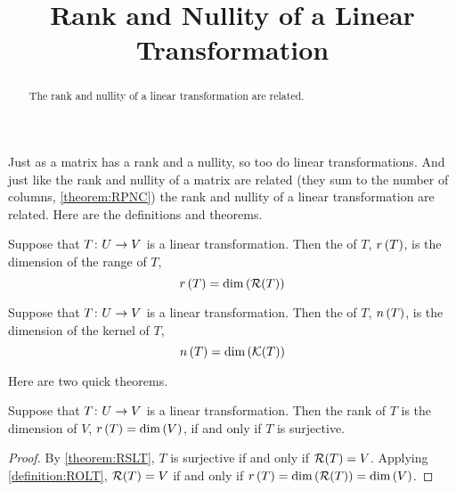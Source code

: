 \documentclass{ximera}
\title{Rank and Nullity of a Linear Transformation}
\begin{document}
\begin{abstract}
  The rank and nullity of a linear transformation are related.
\end{abstract}
\maketitle


Just as a matrix has a rank and a nullity, so too do linear transformations.  And just like the rank and nullity of a matrix are related (they sum to the number of columns, \ref{theorem:RPNC}) the rank and nullity of a linear transformation are related.  Here are the definitions and theorems.

\begin{definition}

Suppose that $T\colon U\rightarrow V$ is a linear transformation.  Then the  of $T$, $r\left(T\right)$, is the dimension of the range of $T$,
\[
r\left(T\right)=\dim\left(\mathcal{R}\!\left(T\right)\right)
\]

\end{definition}

\begin{definition}

Suppose that $T\colon U\rightarrow V$ is a linear transformation.  Then the  of $T$, $n\left(T\right)$, is the dimension of the kernel of $T$,
\[
n\left(T\right)=\dim\left(\mathcal{K}\!\left(T\right)\right)
\]
\end{definition}

Here are two quick theorems.

\begin{theorem}
\label{theorem:ROSLT}


Suppose that $T\colon U\rightarrow V$ is a linear transformation.  Then the rank of $T$ is the dimension of $V$, $r\left(T\right)=\dim\left(V\right)$, if and only if $T$ is surjective.





\begin{proof}
By \ref{theorem:RSLT}, $T$ is surjective if and only if $\mathcal{R}\!\left(T\right)=V$.  Applying \ref{definition:ROLT}, $\mathcal{R}\!\left(T\right)=V$ if and only if $r\left(T\right)=\dim\left(\mathcal{R}\!\left(T\right)\right)=\dim\left(V\right)$.



\end{proof}
\end{theorem}
\end{document}
